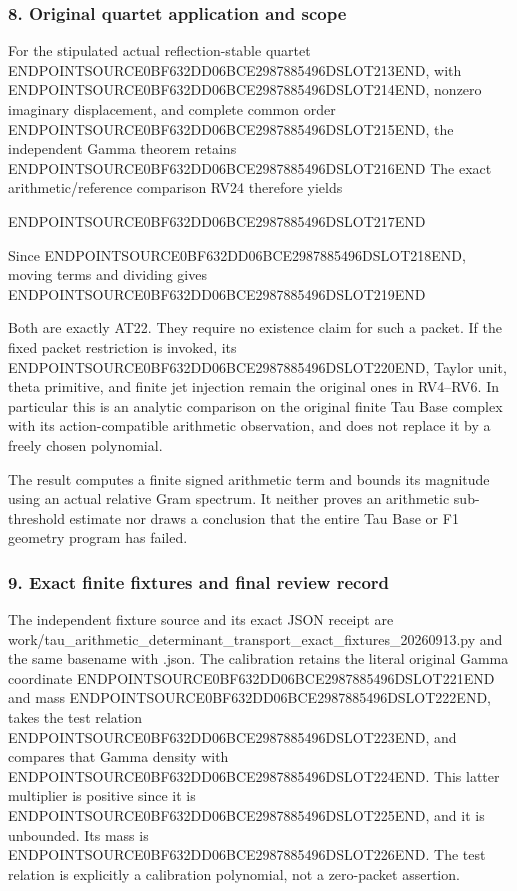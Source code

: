 \subsubsection{8. Original quartet application and scope}\label{endpoint-determinant_review--original-quartet-application-and-scope}

For the stipulated actual reflection-stable quartet ENDPOINTSOURCE0BF632DD06BCE2987885496DSLOT213END, with ENDPOINTSOURCE0BF632DD06BCE2987885496DSLOT214END, nonzero imaginary displacement, and complete common order ENDPOINTSOURCE0BF632DD06BCE2987885496DSLOT215END, the independent Gamma theorem retains ENDPOINTSOURCE0BF632DD06BCE2987885496DSLOT216END The exact arithmetic/reference comparison RV24 therefore yields

ENDPOINTSOURCE0BF632DD06BCE2987885496DSLOT217END

Since ENDPOINTSOURCE0BF632DD06BCE2987885496DSLOT218END, moving terms and dividing gives ENDPOINTSOURCE0BF632DD06BCE2987885496DSLOT219END

Both are exactly AT22. They require no existence claim for such a packet. If the fixed packet restriction is invoked, its ENDPOINTSOURCE0BF632DD06BCE2987885496DSLOT220END, Taylor unit, theta primitive, and finite jet injection remain the original ones in RV4--RV6. In particular this is an analytic comparison on the original finite Tau Base complex with its action-compatible arithmetic observation, and does not replace it by a freely chosen polynomial.

The result computes a finite signed arithmetic term and bounds its magnitude using an actual relative Gram spectrum. It neither proves an arithmetic sub-threshold estimate nor draws a conclusion that the entire Tau Base or F1 geometry program has failed.

\subsubsection{9. Exact finite fixtures and final review record}\label{endpoint-determinant_review--exact-finite-fixtures-and-final-review-record}

The independent fixture source and its exact JSON receipt are work/tau\_arithmetic\_determinant\_transport\_exact\_fixtures\_20260913.py and the same basename with .json. The calibration retains the literal original Gamma coordinate ENDPOINTSOURCE0BF632DD06BCE2987885496DSLOT221END and mass ENDPOINTSOURCE0BF632DD06BCE2987885496DSLOT222END, takes the test relation ENDPOINTSOURCE0BF632DD06BCE2987885496DSLOT223END, and compares that Gamma density with ENDPOINTSOURCE0BF632DD06BCE2987885496DSLOT224END. This latter multiplier is positive since it is ENDPOINTSOURCE0BF632DD06BCE2987885496DSLOT225END, and it is unbounded. Its mass is ENDPOINTSOURCE0BF632DD06BCE2987885496DSLOT226END. The test relation is explicitly a calibration polynomial, not a zero-packet assertion.

